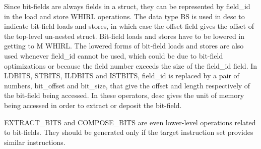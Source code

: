 Since bit-fields are always fields in a struct, they can be
represented by field\_id in the load and store WHIRL operations. The
data type BS is used in desc to indicate bit-field loads and stores, in which case
the offset field gives the offset of the top-level un-nested struct.
Bit-field loads and stores have to be lowered in getting to M WHIRL.
The lowered forms of bit-field loads and stores are also used whenever
field\_id cannot be used, which could be due to bit-field optimizations
or because the field number exceeds the size of the field\_id field.
In
%
LDBITS,
%
STBITS,
%
ILDBITS and
%
ISTBITS, field\_id is replaced by a pair
of numbers, bit\_offset and bit\_size, that give the offset and length
respectively of the
bit-field being accessed. In these operators, desc gives the unit
of memory being accessed in order to extract or deposit the
bit-field.

%
EXTRACT\_BITS and 
%
COMPOSE\_BITS are even lower-level operations
related to bit-fields. They should be generated only if the target
instruction set provides similar instructions. 

